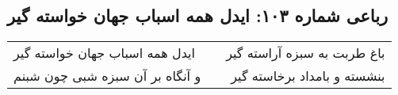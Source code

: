 \begin{center}
\section*{رباعی شماره ۱۰۳: ایدل همه اسباب جهان خواسته گیر}
\label{sec:sh103}
\begin{longtable}{l p{0.5cm} r}
ایدل همه اسباب جهان خواسته گیر
&&
باغ طربت به سبزه آراسته گیر
\\
و آنگاه بر آن سبزه شبی چون شبنم
&&
بنشسته و بامداد برخاسته گیر
\\
\end{longtable}
\end{center}
